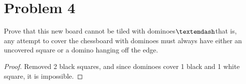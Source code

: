 \documentclass[11pt]{article}
\begin{document}
    \section{Problem 4}\label{sec:chapter_4}

    \begin{theorem}
        Prove that this new board cannot be tiled with dominoes$\textemdash$that is, any attempt to
        cover the chessboard with dominoes must always have either an uncovered square or a
        domino hanging off the edge.
    \end{theorem}
    \begin{proof}
        Removed 2 black squares, and since dominoes cover 1 black and 1 white square, it is
         impossible.
    \end{proof}
\end{document}
